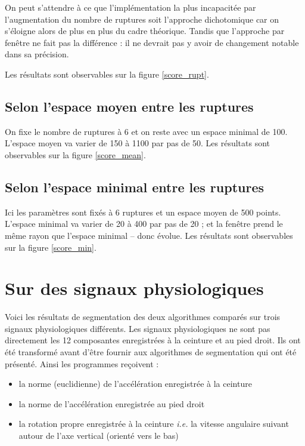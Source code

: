 \documentclass[french,11pt,notitlepage]{report}
\begin{document}
	On peut s'attendre à ce que l'implémentation la plus incapacitée par l'augmentation du nombre de ruptures soit l'approche dichotomique car on s'éloigne alors de plus en plus du cadre théorique.
	Tandis que l'approche par fenêtre ne fait pas la différence : il ne devrait pas y avoir de changement notable dans sa précision.
	
	Les résultats sont observables sur la figure \ref{score_rupt}.
	
	
	
	
	\subsection{Selon l'espace moyen entre les ruptures}
	
	
	On fixe le nombre de ruptures à 6 et on reste avec un espace minimal de 100.
	L'espace moyen va varier de 150 à 1100 par pas de 50.
		Les résultats sont observables sur la figure \ref{score_mean}.
		

	
	
	\subsection{Selon l'espace minimal entre les ruptures}
	
	Ici les paramètres sont fixés à 6 ruptures et un espace moyen de 500 points.
	L'espace minimal va varier de 20 à 400 par pas de 20 ;
	et la fenêtre prend le même rayon que l'espace minimal -- donc évolue.
	Les résultats sont observables sur la figure \ref{score_min}.




	
	
	\section{Sur des signaux physiologiques}
	
	
	Voici les résultats de segmentation des deux algorithmes comparés sur trois signaux physiologiques différents.
	Les signaux physiologiques ne sont pas directement les 12 composantes enregistrées à la ceinture et au pied droit.
	Ils ont été transformé avant d'être fournir aux algorithmes de segmentation qui ont été présenté.
	Ainsi les programmes reçoivent :
	\begin{itemize}
		\item la norme (euclidienne) de l'accélération enregistrée à la ceinture
		\item la norme de l'accélération enregistrée au pied droit
		\item la rotation propre enregistrée à la ceinture \emph{i.e.} la vitesse angulaire suivant autour de l'axe vertical (orienté vers le bas)
	\end{itemize}
	
\end{document}
